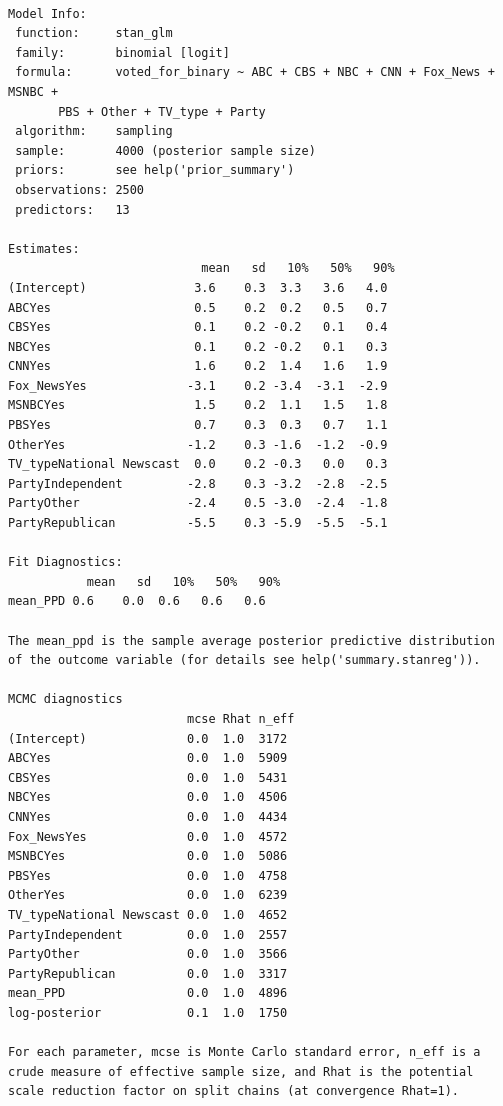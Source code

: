 \documentclass[
  letterpaper,
  DIV=11,
  numbers=noendperiod]{scrartcl}
\begin{document}
\begin{verbatim}

Model Info:
 function:     stan_glm
 family:       binomial [logit]
 formula:      voted_for_binary ~ ABC + CBS + NBC + CNN + Fox_News + MSNBC + 
       PBS + Other + TV_type + Party
 algorithm:    sampling
 sample:       4000 (posterior sample size)
 priors:       see help('prior_summary')
 observations: 2500
 predictors:   13

Estimates:
                           mean   sd   10%   50%   90%
(Intercept)               3.6    0.3  3.3   3.6   4.0 
ABCYes                    0.5    0.2  0.2   0.5   0.7 
CBSYes                    0.1    0.2 -0.2   0.1   0.4 
NBCYes                    0.1    0.2 -0.2   0.1   0.3 
CNNYes                    1.6    0.2  1.4   1.6   1.9 
Fox_NewsYes              -3.1    0.2 -3.4  -3.1  -2.9 
MSNBCYes                  1.5    0.2  1.1   1.5   1.8 
PBSYes                    0.7    0.3  0.3   0.7   1.1 
OtherYes                 -1.2    0.3 -1.6  -1.2  -0.9 
TV_typeNational Newscast  0.0    0.2 -0.3   0.0   0.3 
PartyIndependent         -2.8    0.3 -3.2  -2.8  -2.5 
PartyOther               -2.4    0.5 -3.0  -2.4  -1.8 
PartyRepublican          -5.5    0.3 -5.9  -5.5  -5.1 

Fit Diagnostics:
           mean   sd   10%   50%   90%
mean_PPD 0.6    0.0  0.6   0.6   0.6  

The mean_ppd is the sample average posterior predictive distribution of the outcome variable (for details see help('summary.stanreg')).

MCMC diagnostics
                         mcse Rhat n_eff
(Intercept)              0.0  1.0  3172 
ABCYes                   0.0  1.0  5909 
CBSYes                   0.0  1.0  5431 
NBCYes                   0.0  1.0  4506 
CNNYes                   0.0  1.0  4434 
Fox_NewsYes              0.0  1.0  4572 
MSNBCYes                 0.0  1.0  5086 
PBSYes                   0.0  1.0  4758 
OtherYes                 0.0  1.0  6239 
TV_typeNational Newscast 0.0  1.0  4652 
PartyIndependent         0.0  1.0  2557 
PartyOther               0.0  1.0  3566 
PartyRepublican          0.0  1.0  3317 
mean_PPD                 0.0  1.0  4896 
log-posterior            0.1  1.0  1750 

For each parameter, mcse is Monte Carlo standard error, n_eff is a crude measure of effective sample size, and Rhat is the potential scale reduction factor on split chains (at convergence Rhat=1).
\end{verbatim}
\end{document}
